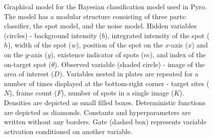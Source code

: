 \begin{figure}[ht]
  \begin{center}
    
  \end{center}
  \caption{Graphical model for the Bayesian classification model used in Pyro. The model has a modular structure consisting of three parts: classifier, the spot model, and the noise model. Hidden variables (circles) - background intensity ($b$), integrated intensity of the spot ($h$), width of the spot ($w$), position of the spot on the $x$-axis ($x$) and on the $y$-axis ($y$), existence indicator of spots ($m$), and index of the on-target spot ($\theta$). Observed variable (shaded circle) - image of the area of interest ($D$). Variables nested in plates are repeated for a number of times displayed at the bottom-right corner - target sites ($N$), frame count ($F$), number of spots in a single image ($K$). Densities are depicted as  small filled boxes. Deterministic functions are depicted as diamonds. Constants and hyperparameters are written without any borders. Gate (dashed box) represents variable activation conditioned on another variable.}
  \label{fig:graph}
\end{figure}

